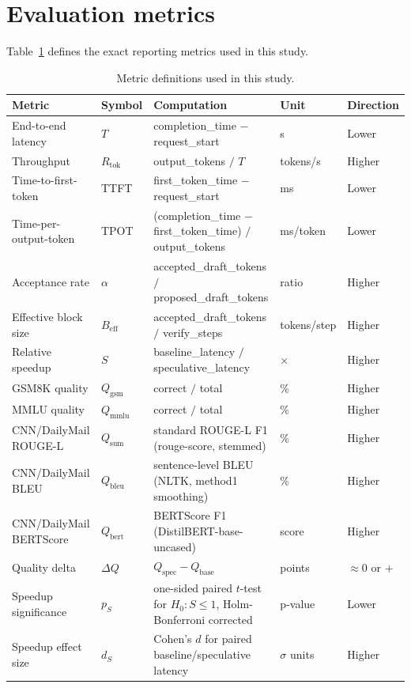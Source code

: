\section{Evaluation metrics}
\label{sec:metrics}

Table~\ref{tab:metrics} defines the exact reporting metrics used in this study.

\begin{table}[t]
\centering
\caption{Metric definitions used in this study.}
\label{tab:metrics}
\small
\setlength{\tabcolsep}{5.8pt}
\begin{tabular}{lllll}
\hline
\textbf{Metric} & \textbf{Symbol} & \textbf{Computation} & \textbf{Unit} & \textbf{Direction} \\
\hline
End-to-end latency & $T$ & completion\_time $-$ request\_start & s & Lower \\
Throughput & $R_{\text{tok}}$ & output\_tokens $/$ $T$ & tokens/s & Higher \\
Time-to-first-token & TTFT & first\_token\_time $-$ request\_start & ms & Lower \\
Time-per-output-token & TPOT & (completion\_time $-$ first\_token\_time) $/$ output\_tokens & ms/token & Lower \\
Acceptance rate & $\alpha$ & accepted\_draft\_tokens $/$ proposed\_draft\_tokens & ratio & Higher \\
Effective block size & $B_{\text{eff}}$ & accepted\_draft\_tokens $/$ verify\_steps & tokens/step & Higher \\
Relative speedup & $S$ & baseline\_latency $/$ speculative\_latency & $\times$ & Higher \\
GSM8K quality & $Q_{\text{gsm}}$ & correct $/$ total & \% & Higher \\
MMLU quality & $Q_{\text{mmlu}}$ & correct $/$ total & \% & Higher \\
CNN/DailyMail ROUGE-L & $Q_{\text{sum}}$ & standard ROUGE-L F1 (rouge-score, stemmed) & \% & Higher \\
CNN/DailyMail BLEU & $Q_{\text{bleu}}$ & sentence-level BLEU (NLTK, method1 smoothing) & \% & Higher \\
CNN/DailyMail BERTScore & $Q_{\text{bert}}$ & BERTScore F1 (DistilBERT-base-uncased) & score & Higher \\
Quality delta & $\Delta Q$ & $Q_{\text{spec}} - Q_{\text{base}}$ & points & $\approx 0$ or $+$ \\
Speedup significance & $p_S$ & one-sided paired $t$-test for $H_0: S\le 1$, Holm-Bonferroni corrected & p-value & Lower \\
Speedup effect size & $d_S$ & Cohen's $d$ for paired baseline/speculative latency & $\sigma$ units & Higher \\
\hline
\end{tabular}
\end{table}

